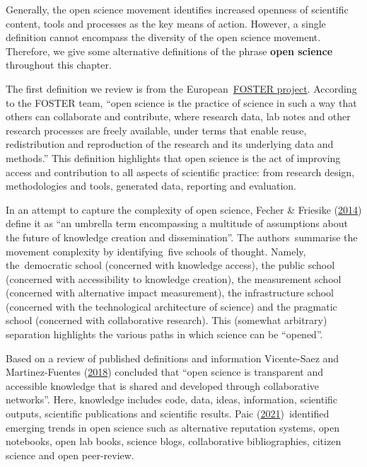 \documentclass[
]{book}
\begin{document}
Generally, the open science movement identifies increased openness of scientific content, tools and processes as the key means of action. However, a single definition cannot encompass the diversity of the open science movement. Therefore, we give some alternative definitions of the phrase \textbf{open science} throughout this chapter.

The first definition we review is from the European~\href{https://www.fosteropenscience.eu/}{}\href{https://www.fosteropenscience.eu/}{FOSTER project}. According to the FOSTER team, ``open science is the practice of science in such a way that others can collaborate and contribute, where research data, lab notes and other research processes are freely available, under terms that enable reuse, redistribution and reproduction of the research and its underlying data and methods.'' This definition highlights that open science is the act of improving access and contribution to all aspects of scientific practice: from research design, methodologies and tools, generated data, reporting and evaluation.

In an attempt to capture the complexity of open science, Fecher \& Friesike (\href{https://www.researchgate.net/publication/236607487_Open_Science_One_Term_Five_Schools_of_Thought}{2014}) define it as ``an umbrella term encompassing a multitude of assumptions about the future of knowledge creation and dissemination''. The authors~summarise the movement complexity by identifying~five schools of thought. Namely, the~democratic school (concerned with knowledge access), the public school (concerned with accessibility to knowledge creation), the measurement school (concerned with alternative impact measurement), the infrastructure school (concerned with the technological architecture of science) and the pragmatic school (concerned with collaborative research). This (somewhat arbitrary) separation highlights the various paths in which science can be ``opened''.

Based on a review of published definitions and information Vicente-Saez and Martinez-Fuentes (\href{https://isiarticles.com/bundles/Article/pre/pdf/143111.pdf}{2018}) concluded that ``open science is transparent and accessible knowledge that is shared and developed through collaborative networks''. Here, knowledge includes code, data, ideas, information, scientific outputs, scientific publications and scientific results. Paic (\href{https://goingdigital.oecd.org/data/notes/No13_ToolkitNote_OpenScience.pdf}{2021})~identified emerging trends in open science such as alternative reputation systems, open notebooks, open lab books, science blogs, collaborative bibliographies, citizen science and open peer-review.
\end{document}
